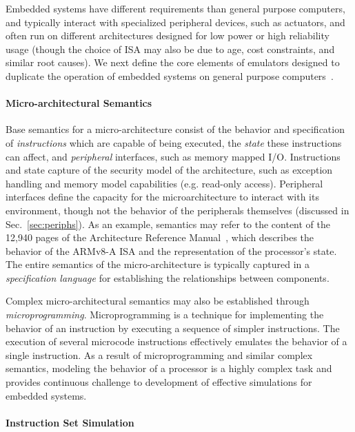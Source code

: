 Embedded systems have different requirements than general purpose computers, and typically interact with specialized peripheral devices, such as actuators, and often run on different architectures designed for low power or high reliability usage (though the choice of ISA may also be due to age, cost constraints, and similar root causes).
We next define the core elements of emulators designed to duplicate the operation of embedded systems on general purpose computers~\cite{armstrong2019isa}.

\paragraph{Micro-architectural Semantics}

Base semantics for a micro-architecture consist of the behavior and specification of \emph{instructions} which are capable of being executed, the \emph{state} these instructions can affect, and \emph{peripheral} interfaces, such as memory mapped I/O.
Instructions and state capture of the security model of the architecture, such as exception handling and memory model capabilities (e.g. read-only access).
Peripheral interfaces define the capacity for the microarchitecture to interact with its environment, though not the behavior of the peripherals themselves (discussed in Sec.~\ref{sec:periphs}).
As an example, semantics may refer to the content of the 12,940 pages of the Architecture Reference Manual~\cite{arm2023ref}, which describes the behavior of the ARMv8-A ISA and the representation of the processor's state.
The entire semantics of the micro-architecture is typically captured in a \emph{specification language} for establishing the relationships between components.

Complex micro-architectural semantics may also be established through \emph{microprogramming}.
Microprogramming is a technique for implementing the behavior of an instruction by executing a sequence of simpler instructions.
The execution of several microcode instructions effectively emulates the behavior of a single instruction.
As a result of microprogramming and similar complex semantics, modeling the behavior of a processor is a highly complex task and provides continuous challenge to development of effective simulations for embedded systems.

\paragraph{Instruction Set Simulation}

